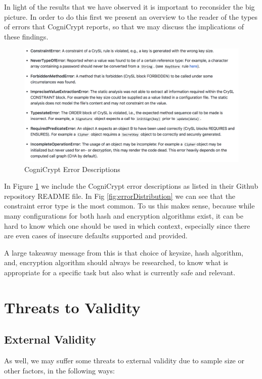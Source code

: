 \documentclass[10pt, conference]{IEEEtran}
\begin{document}
In light of the results that we have observed it is important to reconsider the big picture. In order to do this first we present an overview to the reader of the types of errors that CogniCrypt reports, so that we may discuss the implications of these findings.

\begin{figure}[h]
\begin{center}
\includegraphics[width=0.9\linewidth]{cogrules.png}
\caption{CogniCrypt Error Descriptions \label{fig:cogrules}}
\end{center}
\end{figure}

In Figure \ref{fig:cogrules} we include the CogniCrypt error descriptions as listed in their Github repository README file. In Fig \ref{fig:errorDistribution} we can see that the constraint error type is the most common. To us this makes sense, because while many configurations for both hash and encryption algorithms exist, it can be hard to know which one should be used in which context, especially since there are even cases of insecure defaults supported and provided. 

A large takeaway message from this is that choice of keysize, hash algorithm, and, encryption algorithm should always be researched, to know what is appropriate for a specific task but also what is currently safe and relevant.

\section{Threats to Validity}

\subsection{External Validity}
As well, we may suffer some threats to external validity due to sample size or other factors, in the  following ways:
\end{document}
